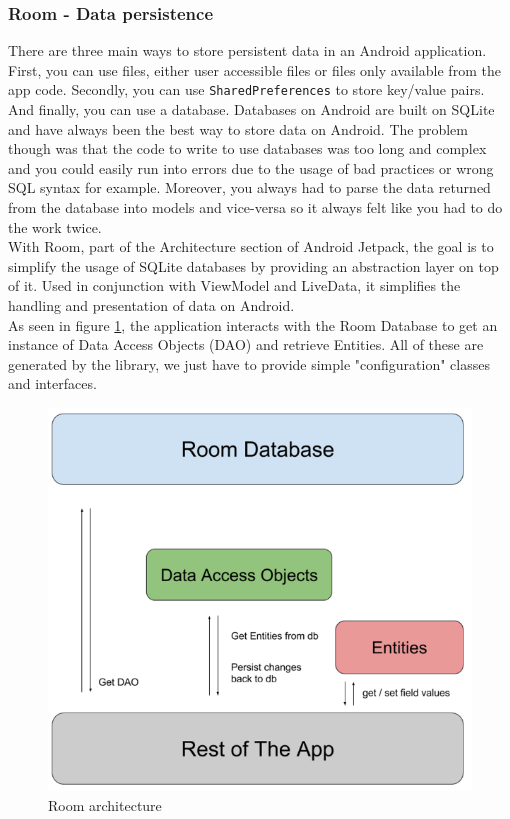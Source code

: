 \documentclass[11pt,a4paper]{report}
\begin{document}
\subsubsection{Room - Data persistence}
There are three main ways to store persistent data in an Android application. First, you can use files, either user accessible files or files only available from the app code. Secondly, you can use \verb+SharedPreferences+ to store key/value pairs. And finally, you can use a database. Databases on Android are built on SQLite and have always been the best way to store data on Android. The problem though was that the code to write to use databases was too long and complex and you could easily run into errors due to the usage of bad practices or wrong SQL syntax for example. Moreover, you always had to parse the data returned from the database into models and vice-versa so it always felt like you had to do the work twice.\\

With Room\cite{android:doc:jetpack:room}, part of the Architecture section of Android Jetpack, the goal is to simplify the usage of SQLite databases by providing an abstraction layer on top of it. Used in conjunction with ViewModel and LiveData, it simplifies the handling and presentation of data on Android.\\

As seen in figure \ref{room_architecture_img}, the application interacts with the Room Database to get an instance of Data Access Objects (DAO) and retrieve Entities. All of these are generated by the library, we just have to provide simple "configuration" classes and interfaces.\\
\begin{figure}[H]
\begin{center}
	\includegraphics[width=.8\textwidth]{assets/room_architecture}
	\caption[Room architecture]{Room architecture\cite{android:training:jetpack:room}}
	\label{room_architecture_img}
\end{center}
\end{figure}
\end{document}
